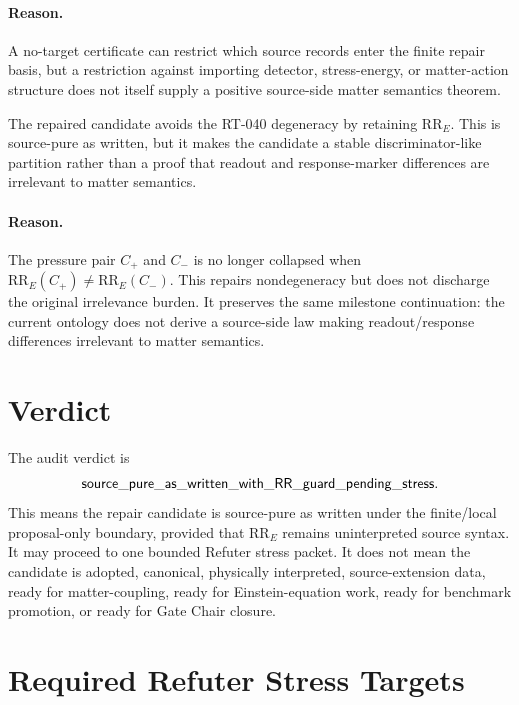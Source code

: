 \paragraph{Reason.}
A no-target certificate can restrict which source records enter the finite
repair basis, but a restriction against importing detector, stress-energy, or
matter-action structure does not itself supply a positive source-side matter
semantics theorem.

\begin{proposition}
The repaired candidate avoids the RT-040 degeneracy by retaining
\(\mathrm{RR}_E\). This is source-pure as written, but it makes the candidate
a stable discriminator-like partition rather than a proof that readout and
response-marker differences are irrelevant to matter semantics.
\end{proposition}

\paragraph{Reason.}
The pressure pair \(C_+\) and \(C_-\) is no longer collapsed when
\(\mathrm{RR}_E(C_+)\neq\mathrm{RR}_E(C_-)\). This repairs nondegeneracy but
does not discharge the original irrelevance burden. It preserves the same
milestone continuation: the current ontology does not derive a source-side
law making readout/response differences irrelevant to matter semantics.

\section{Verdict}

The audit verdict is
\[
  \mathsf{source\_pure\_as\_written\_with\_RR\_guard\_pending\_stress}.
\]
This means the repair candidate is source-pure as written under the
finite/local proposal-only boundary, provided that \(\mathrm{RR}_E\) remains
uninterpreted source syntax. It may proceed to one bounded Refuter stress
packet. It does not mean the candidate is adopted, canonical, physically
interpreted, source-extension data, ready for matter-coupling, ready for
Einstein-equation work, ready for benchmark promotion, or ready for Gate Chair
closure.

\section{Required Refuter Stress Targets}

